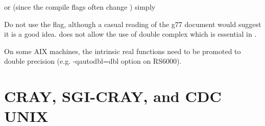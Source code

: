 \documentclass[11pt,oneside]{report} %
\begin{document}
or (since the compile flags often change ) simply
\begin{center}
\end{center}
\noindent Do not use the  flag, although a casual
reading of the g77 document would suggest it is a good idea.
 does not allow the use of double complex which
is essential in {\feff}.

On some AIX machines, the intrinsic real functions need to be promoted 
to double precision (e.g. -qautodbl=dbl option on RS6000). 


\section{CRAY, SGI-CRAY, and CDC UNIX}
\label{sec:CRAYusers}
\end{document}
